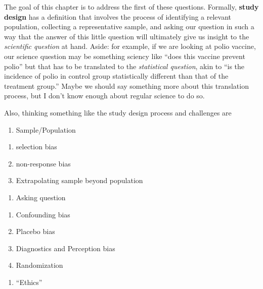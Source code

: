 \documentclass[
]{book}
\providecommand{\tightlist}{%
  \setlength{\itemsep}{0pt}\setlength{\parskip}{0pt}}
\theoremstyle{definition}
\theoremstyle{definition}
\theoremstyle{definition}
\theoremstyle{remark}
\begin{document}
The goal of this chapter is to address the first of these questions. Formally, \textbf{study design} has a definition that involves the process of identifying a relevant population, collecting a representative sample, and asking our question in such a way that the answer of this little question will ultimately give us insight to the \emph{scientific question} at hand. Aside: for example, if we are looking at polio vaccine, our science question may be something sciency like ``does this vaccine prevent polio'' but that has to be translated to the \emph{statistical question}, akin to ``is the incidence of polio in control group statistically different than that of the treatment group.'' Maybe we should say something more about this translation process, but I don't know enough about regular science to do so.

Also, thinking something like the study design process and challenges are

\begin{enumerate}
\def\labelenumi{\arabic{enumi}.}
\tightlist
\item
  Sample/Population
\end{enumerate}

\begin{enumerate}
\def\labelenumi{\roman{enumi}.}
\tightlist
\item
  selection bias
\item
  non-response bias
\item
  Extrapolating sample beyond population
\end{enumerate}

\begin{enumerate}
\def\labelenumi{\arabic{enumi}.}
\setcounter{enumi}{1}
\tightlist
\item
  Asking question
\end{enumerate}

\begin{enumerate}
\def\labelenumi{\roman{enumi}.}
\tightlist
\item
  Confounding bias
\item
  Placebo bias
\item
  Diagnostics and Perception bias
\item
  Randomization
\end{enumerate}

\begin{enumerate}
\def\labelenumi{\arabic{enumi}.}
\setcounter{enumi}{2}
\tightlist
\item
  ``Ethics''
\end{enumerate}
\end{document}
